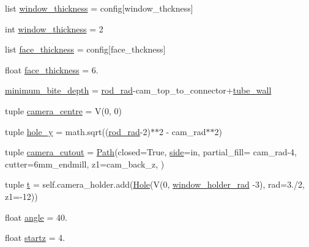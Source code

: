 \begin{DoxyCompactItemize}
\item 
list \hyperlink{classboxes_1_1_thermal_turret_aec3eeb69c8f1c74fc941ce7bbe79231f}{window\+\_\+thickness} = config\mbox{[}\textquotesingle{}window\+\_\+thckness\textquotesingle{}\mbox{]}
\item 
int \hyperlink{classboxes_1_1_thermal_turret_a48e28948ac70c45aa41b3ee3f1260c88}{window\+\_\+thickness} = 2
\item 
list \hyperlink{classboxes_1_1_thermal_turret_a3fa55e0be67cd754f7a2ee6ba9114bd7}{face\+\_\+thickness} = config\mbox{[}\textquotesingle{}face\+\_\+thckness\textquotesingle{}\mbox{]}
\item 
float \hyperlink{classboxes_1_1_thermal_turret_a60cdde3cc35554e9e663b97222c04323}{face\+\_\+thickness} = 6.
\item 
\hyperlink{classboxes_1_1_thermal_turret_ae4006d874c27a729856c09b1e2e0b761}{minimum\+\_\+bite\+\_\+depth} = \hyperlink{classboxes_1_1_thermal_turret_a078053e29ed936247e167e380726b3a5}{rod\+\_\+rad}-\/cam\+\_\+top\+\_\+to\+\_\+connector+\hyperlink{classboxes_1_1_thermal_turret_a2e661e57f0edb505bba19f7b4448746b}{tube\+\_\+wall}
\item 
tuple \hyperlink{classboxes_1_1_thermal_turret_a352dbf0c59cb3cadbfca9a36c5b6f3f6}{camera\+\_\+centre} = V(0, 0)
\item 
tuple \hyperlink{classboxes_1_1_thermal_turret_a9120663d179eeb2f51fbd6a0533d82be}{hole\+\_\+y} = math.\+sqrt((\hyperlink{classboxes_1_1_thermal_turret_a078053e29ed936247e167e380726b3a5}{rod\+\_\+rad}-\/2)$\ast$$\ast$2 -\/ cam\+\_\+rad$\ast$$\ast$2)
\item 
tuple \hyperlink{classboxes_1_1_thermal_turret_a0dc21b9d8ef70d2d7c7f3768b58c883d}{camera\+\_\+cutout} = \hyperlink{classpath_1_1_path}{Path}(closed=True, \hyperlink{classboxes_1_1_turret_a1f5dd6ea8b99161aefb38d331cb093f4}{side}=\textquotesingle{}in\textquotesingle{}, partial\+\_\+fill= cam\+\_\+rad-\/4, cutter=\textquotesingle{}6mm\+\_\+endmill\textquotesingle{}, z1=cam\+\_\+back\+\_\+z, )
\item 
tuple \hyperlink{classboxes_1_1_thermal_turret_ab658b9678ea4d2be36c21999d1d40ad9}{t} = self.\+camera\+\_\+holder.\+add(\hyperlink{classshapes_1_1_hole}{Hole}(V(0, \hyperlink{classboxes_1_1_thermal_turret_af32d01022aa50258191fa93abfd79d34}{window\+\_\+holder\+\_\+rad} -\/3), rad=3./2, z1=-\/12))
\item 
float \hyperlink{classboxes_1_1_thermal_turret_a83b3903d6f4c066c1b9eea21acc88ce8}{angle} = 40.
\item 
float \hyperlink{classboxes_1_1_thermal_turret_ac73c1f1b0ed041451a3265b27e94a132}{startz} = 4.

\end{DoxyCompactItemize}
